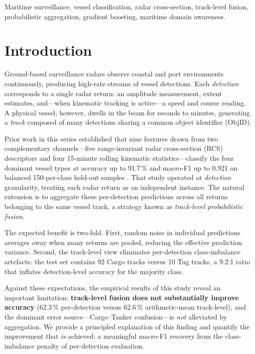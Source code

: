\documentclass[10pt,journal,compsoc]{IEEEtran}
\begin{document}
\begin{IEEEkeywords}
Maritime surveillance, vessel classification, radar cross-section,
track-level fusion, probabilistic aggregation, gradient boosting,
maritime domain awareness.
\end{IEEEkeywords}

\section{Introduction}\label{sec:intro}

Ground-based surveillance radars observe coastal and port environments
continuously, producing high-rate streams of vessel detections.  Each
\emph{detection} corresponds to a single radar return: an amplitude
measurement, extent estimates, and---when kinematic tracking is active---a
speed and course reading.  A physical vessel, however, dwells in the beam for
seconds to minutes, generating a \emph{track} composed of many detections
sharing a common object identifier (ObjID).

Prior work in this series established that nine features drawn from two
complementary channels---five range-invariant radar cross-section (RCS)
descriptors and four 15-minute rolling kinematic statistics---classify the
four dominant vessel types at accuracy up to 91.7\,\% and macro-F1 up to
0.921 on balanced 150-per-class held-out samples
\cite{paper6_kinrcs}.  That study operated at \emph{detection} granularity,
treating each radar return as an independent instance.  The natural extension
is to aggregate these per-detection predictions across all returns belonging
to the same vessel track, a strategy known as \emph{track-level
probabilistic fusion}.

The expected benefit is two-fold.  First, random noise in individual
predictions averages away when many returns are pooled, reducing the effective
prediction variance.  Second, the track-level view eliminates per-detection
class-imbalance artefacts: the test set contains 92 Cargo tracks versus 10 Tug
tracks, a 9.2:1 ratio that inflates detection-level accuracy for the majority
class.

Against these expectations, the empirical results of this study reveal an
important limitation: \textbf{track-level fusion does not substantially improve
accuracy} (62.3\,\% per-detection versus 62.6\,\% arithmetic-mean track-level),
and the dominant error source---Cargo--Tanker confusion---is \emph{not}
alleviated by aggregation.  We provide a principled explanation of this
finding and quantify the improvement that \emph{is} achieved: a meaningful
macro-F1 recovery from the class-imbalance penalty of per-detection evaluation.
\end{document}
